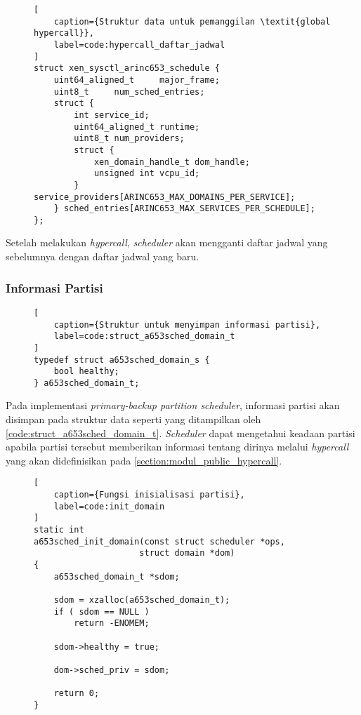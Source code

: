 \begin{figure}[!ht]
\begin{lstlisting}[
	caption={Struktur data untuk pemanggilan \textit{global hypercall}},
	label=code:hypercall_daftar_jadwal
]
struct xen_sysctl_arinc653_schedule {
    uint64_aligned_t     major_frame;
    uint8_t     num_sched_entries;
    struct {
        int service_id;
        uint64_aligned_t runtime;
        uint8_t num_providers;
        struct {
            xen_domain_handle_t dom_handle;
            unsigned int vcpu_id;
        } service_providers[ARINC653_MAX_DOMAINS_PER_SERVICE];
    } sched_entries[ARINC653_MAX_SERVICES_PER_SCHEDULE];
};
\end{lstlisting}
\end{figure}

Setelah melakukan \textit{hypercall}, \textit{scheduler} akan mengganti daftar jadwal yang
sebelumnya dengan daftar jadwal yang baru.

\subsubsection{Informasi Partisi}
\label{section:informasi_partisi_impl}

\begin{figure}[!ht]
\begin{lstlisting}[
	caption={Struktur untuk menyimpan informasi partisi},
	label=code:struct_a653sched_domain_t
]
typedef struct a653sched_domain_s {
    bool healthy;
} a653sched_domain_t;
\end{lstlisting}
\end{figure}

Pada implementasi \textit{primary-backup partition scheduler}, informasi partisi akan disimpan
pada struktur data seperti yang ditampilkan oleh \autoref{code:struct_a653sched_domain_t}.
\textit{Scheduler} dapat mengetahui keadaan partisi apabila partisi tersebut memberikan
informasi tentang dirinya melalui \textit{hypercall} yang akan didefinisikan pada
\autoref{section:modul_public_hypercall}.

\begin{figure}[!hb]
\begin{lstlisting}[
	caption={Fungsi inisialisasi partisi},
	label=code:init_domain
]
static int
a653sched_init_domain(const struct scheduler *ops,
                     struct domain *dom)
{
    a653sched_domain_t *sdom;

    sdom = xzalloc(a653sched_domain_t);
    if ( sdom == NULL )
        return -ENOMEM;

    sdom->healthy = true;

    dom->sched_priv = sdom;

    return 0;
}
\end{lstlisting}
\end{figure}

